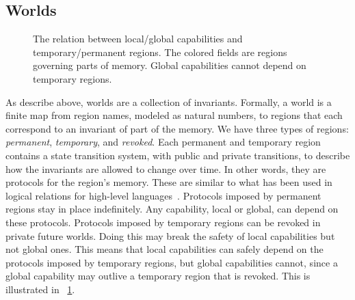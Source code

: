 \documentclass{llncs}
\newcommand\lau[1]{{\color{purple} \sf \footnotesize {LS: #1}}\\}
\newcommand\dominique[1]{{\color{purple} \sf \footnotesize {DD: #1}}\\}
\renewcommand\lau[1]{}
\renewcommand\dominique[1]{}
\newcommand{\plainview}[1]{\mathrm{#1}}
\newcommand{\perma}{\plainview{perm}}
\newcommand{\temp}{\plainview{temp}}
\newcommand{\revoked}{\plainview{revoked}}
\begin{document}
\subsection{Worlds}
\begin{figure}
  \centering

  \caption{The relation between local/global capabilities and temporary/permanent
    regions. The colored fields are regions governing parts of memory. Global capabilities cannot depend on temporary
    regions.}
  \label{fig:cap-world}
\end{figure}

As describe above, worlds are a collection of invariants. Formally, a world is a
finite map from region names, modeled as natural numbers, to regions that each
correspond to an invariant of part of the memory.  We have three types of
regions: \emph{permanent}, \emph{temporary}, and \emph{revoked}.
Each permanent and temporary region contains a state transition system, with
public and private transitions, to describe how the invariants are allowed to
change over time. In other words, they are protocols for the region's
memory. These are similar to what has been used in logical relations for
high-level
languages~\cite{Ahmed:popl09,Dreyer:jfp12,Devriese:2016ObjCap}. Protocols
imposed by permanent regions stay in place indefinitely. Any capability, local
or global, can depend on these protocols. Protocols imposed by temporary regions
can be revoked in private future worlds. Doing this may break the safety of
local capabilities but not global ones. This means that local capabilities
can safely depend on the protocols imposed by temporary regions, but global
capabilities cannot, since a global capability may outlive a temporary region
that is revoked. This is illustrated in \figurename~\ref{fig:cap-world}.
\end{document}
